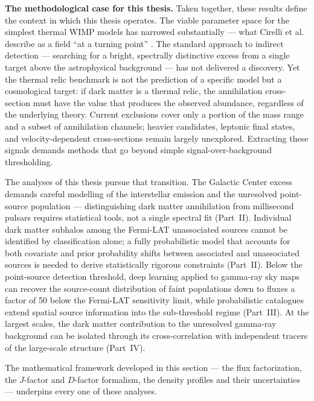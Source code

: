 \textbf{The methodological case for this thesis.}
Taken together, these results define the context in which this thesis operates.
The viable parameter space for the simplest thermal WIMP models has narrowed substantially --- what Cirelli et al.
describe as a field ``at a turning point'' \cite{Cirelli:2024ssz}.
The standard approach to indirect detection --- searching for a bright, spectrally distinctive excess from a single target above the astrophysical background --- has not delivered a discovery.
Yet the thermal relic benchmark is not the prediction of a specific model but a cosmological target: if dark matter is a thermal relic, the annihilation cross-section must have the value that produces the observed abundance, regardless of the underlying theory.
Current exclusions cover only a portion of the mass range and a subset of annihilation channels; heavier candidates, leptonic final states, and velocity-dependent cross-sections remain largely unexplored.
Extracting these signals demands methods that go beyond simple signal-over-background thresholding.

The analyses of this thesis pursue that transition.
The Galactic Center excess demands careful modelling of the interstellar emission and the unresolved point-source population --- distinguishing dark matter annihilation from millisecond pulsars requires statistical tools, not a single spectral fit (Part~II).
Individual dark matter subhalos among the Fermi-LAT unassociated sources cannot be identified by classification alone; a fully probabilistic model that accounts for both covariate and prior probability shifts between associated and unassociated sources is needed to derive statistically rigorous constraints (Part~II).
Below the point-source detection threshold, deep learning applied to gamma-ray sky maps can recover the source-count distribution of faint populations down to fluxes a factor of 50 below the Fermi-LAT sensitivity limit, while probabilistic catalogues extend spatial source information into the sub-threshold regime (Part~III).
At the largest scales, the dark matter contribution to the unresolved gamma-ray background can be isolated through its cross-correlation with independent tracers of the large-scale structure (Part~IV).

The mathematical framework developed in this section --- the flux factorization, the $J$-factor and $D$-factor formalism, the density profiles and their uncertainties --- underpins every one of these analyses.

